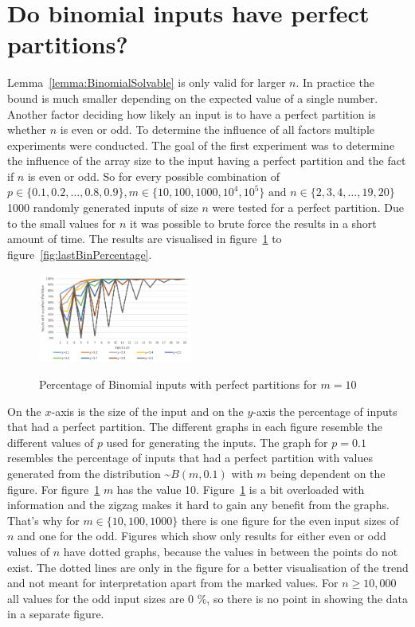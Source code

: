 \section{Do binomial inputs have perfect partitions?}

Lemma~\ref{lemma:BinomialSolvable} is only valid for larger $n$.
In practice the bound is much smaller depending on the expected value of a single number.
Another factor deciding how likely an input is to have a perfect partition is whether $n$ is even or odd.
To determine the influence of all factors multiple experiments were conducted.
The goal of the first experiment was to determine the influence of the array size to the input having a perfect partition and the fact if $n$ is even or odd.
So for every possible combination of $p \in \{0.1, 0.2, \dots , 0.8, 0.9\}, m \in \{10,100,1000,10^4,10^5\} \text{ and } n \in \{2,3,4,\dots,19,20\}$ 1000 randomly generated inputs of size $n$ were tested for a perfect partition.
Due to the small values for $n$ it was possible to brute force the results in a short amount of time.
The results are visualised in figure~\ref{fig:firstBinPercentage} to figure~\ref{fig:lastBinPercentage}.

\begin{figure}[h]
      \caption{Percentage of Binomial inputs with perfect partitions for $m = 10$}
      \centering
      \includegraphics[width=0.45\textwidth]{figures/images/solvabilityOfInputs/binomial_Input_Solvable_m10.png}\label{fig:firstBinPercentage}
\end{figure}

On the $x$-axis is the size of the input and on the $y$-axis the percentage of inputs that had a perfect partition.
The different graphs in each figure resemble the different values of $p$ used for generating the inputs.
The graph for $p=0.1$ resembles the percentage of inputs that had a perfect partition with values generated from the distribution \textasciitilde$B(m,0.1)$ with $m$ being dependent on the figure.
For figure~\ref{fig:firstBinPercentage} $m$ has the value 10.\newline
Figure~\ref{fig:firstBinPercentage} is a bit overloaded with information and the zigzag makes it hard to gain any benefit from the graphs.
That's why for $m \in \{10,100,1000\}$ there is one figure for the even input sizes of $n$ and one for the odd.
Figures which show only results for either even or odd values of $n$ have dotted graphs, because the values in between the points do not exist.
The dotted lines are only in the figure for a better visualisation of the trend and not meant for interpretation apart from the marked values.
For $n\ge10,000$ all values for the odd input sizes are 0 \%, so there is no point in showing the data in a separate figure.


